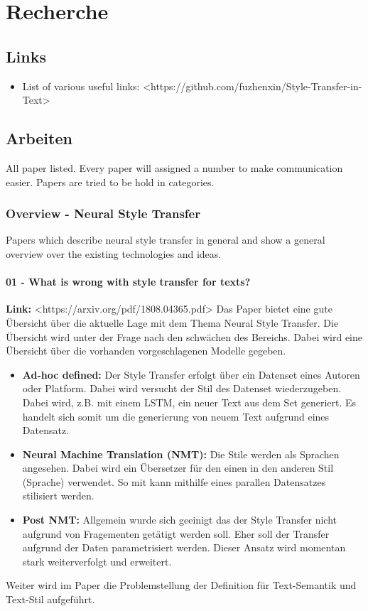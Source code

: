 \chapter{Recherche}
\label{app:recherche}

\section{Links}
\begin{itemize}
    \item List of various useful links: <https://github.com/fuzhenxin/Style-Transfer-in-Text>
\end{itemize}

\section{Arbeiten}
All paper listed. Every paper will assigned a number to make communication easier. Papers are tried to be hold in
categories.

\subsection{Overview - Neural Style Transfer}
Papers which describe neural style transfer in general and show a general overview over the existing technologies and
ideas.

\subsubsection{01 - What is wrong with style transfer for texts?}
\textbf{Link: } <https://arxiv.org/pdf/1808.04365.pdf>
\newline
\newline
Das Paper bietet eine gute Übersicht über die aktuelle Lage mit dem Thema Neural Style Transfer. Die Übersicht wird
unter der Frage nach den schwächen des Bereichs.
\newline
\newline
Dabei wird eine Übersicht über die vorhanden vorgeschlagenen Modelle gegeben.
\begin{itemize}
    \item \textbf{Ad-hoc defined:} Der Style Transfer erfolgt über ein Datenset eines Autoren oder Platform. Dabei wird
    versucht der Stil des Datenset wiederzugeben. Dabei wird, z.B. mit einem LSTM, ein neuer Text aus dem Set generiert.
    Es handelt sich somit um die generierung von neuem Text aufgrund eines Datensatz.
    \item \textbf{Neural Machine Translation (NMT):} Die Stile werden als Sprachen angesehen. Dabei wird ein Übersetzer
    für den einen in den anderen Stil (Sprache) verwendet. So mit kann mithilfe eines parallen Datensatzes stilisiert
    werden.
    \item \textbf{Post NMT:} Allgemein wurde sich geeinigt das der Style Transfer nicht aufgrund von Fragementen
    getätigt werden soll. Eher soll der Transfer aufgrund der Daten parametrisiert werden. Dieser Ansatz wird momentan
    stark weiterverfolgt und erweitert.
\end{itemize}
Weiter wird im Paper die Problemstellung der Definition für Text-Semantik und Text-Stil aufgeführt.

